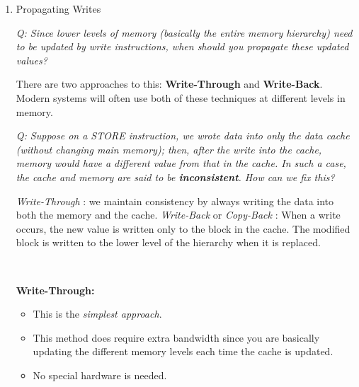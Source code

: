 \documentclass[12pt]{article}
\newenvironment{QandA}{\begin{enumerate}[label=\bfseries\arabic*.]\bfseries}
                      {\end{enumerate}}
\newenvironment{answered}{\par\quad\normalfont}{}
\begin{document}
\begin{QandA}
\begin{answered}
\quad We cannot \textbf{read tag} and \textbf{write data} in parallel because if you happen to write the wrong data - you've made a permanent change and it is hard to recover from this. Therefore, with \textit{write} operations, this is a \textbf{two-step} process where:
\begin{itemize}
    \item You first match the tag
    \item Then write to the matching \textit{way} 
\end{itemize}
This could introduce structural hazards and will require bypassing to avoid unnecessary stalls.
\end{answered}

\ 

\item Propagating Writes
\begin{answered}
\textit{Q: Since lower levels of memory (basically the entire memory hierarchy) need to be updated by write instructions, when should you propagate these updated values?}

\quad There are two approaches to this: \textbf{Write-Through} and \textbf{Write-Back}. Modern systems will often use both of these techniques at different levels in memory. 

\quad \textit{Q: Suppose on a STORE instruction, we wrote data into only the data cache (without changing main memory); then, after the write into the cache, memory would have a different value from that in the cache. In such a case, the cache and memory are said to be \textbf{inconsistent}. How can we fix this?}

\quad \textit{Write-Through} : we maintain consistency by always writing the data into both the memory and the cache. \textit{Write-Back} or \textit{Copy-Back} : When a write occurs, the new value is written only to the block in the cache. The modified block is written to the lower level of the hierarchy when it is replaced. 

\ 

\textbf{Write-Through:}
\begin{itemize}
    \item This is the \textit{simplest approach}.
    \item This method does require extra bandwidth since you are basically updating the different memory levels each time the cache is updated.
    \item No special hardware is needed.
\end{itemize}


\end{answered}
\end{QandA}
\end{document}
